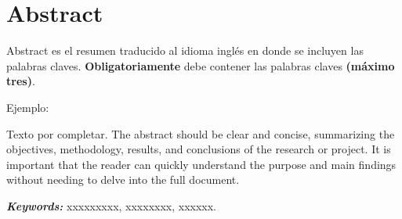 \chapter*{Abstract}

Abstract es el resumen traducido al idioma inglés en donde se incluyen las palabras claves. \textbf{Obligatoriamente} debe contener las palabras claves \textbf{(máximo tres)}.

\vspace{0.5cm}

Ejemplo:

\vspace{0.5cm}

Texto por completar. The abstract should be clear and concise, summarizing the objectives, methodology, results, and conclusions of the research or project. It is important that the reader can quickly understand the purpose and main findings without needing to delve into the full document.

\vspace{0.5cm}

\textbf{\textit{Keywords:}} xxxxxxxxx, xxxxxxxx, xxxxxx.